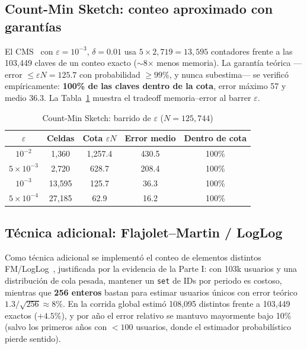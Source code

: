 \documentclass[conference]{IEEEtran}
\begin{document}
\subsection{Count-Min Sketch: conteo aproximado con garantías}
El CMS~\cite{cms} con $\varepsilon=10^{-3}$, $\delta=0.01$ usa $5 \times 2{,}719 = 13{,}595$ contadores frente a las 103{,}449 claves de un conteo exacto ($\sim$8$\times$ menos memoria). La garantía teórica ---error $\leq \varepsilon N = 125.7$ con probabilidad $\geq 99\%$, y nunca subestima--- se verificó empíricamente: \textbf{100\% de las claves dentro de la cota}, error máximo 57 y medio 36.3. La Tabla~\ref{tab:cms} muestra el tradeoff memoria--error al barrer $\varepsilon$.

\begin{table}[H]
  \caption{Count-Min Sketch: barrido de $\varepsilon$ ($N = 125{,}744$)}
  \centering
  \begin{tabular}{ccccc}
    \toprule
    $\varepsilon$ & Celdas & Cota $\varepsilon N$ & Error medio & Dentro de cota \\
    \midrule
    $10^{-2}$          & 1{,}360  & 1{,}257.4 & 430.5 & 100\% \\
    $5\times10^{-3}$   & 2{,}720  & 628.7     & 208.4 & 100\% \\
    $10^{-3}$          & 13{,}595 & 125.7     & 36.3  & 100\% \\
    $5\times10^{-4}$   & 27{,}185 & 62.9      & 16.2  & 100\% \\
    \bottomrule
  \end{tabular}
  \label{tab:cms}
\end{table}

\subsection{Técnica adicional: Flajolet--Martin / LogLog}
Como técnica adicional se implementó el conteo de elementos distintos FM/LogLog~\cite{fm,loglog}, justificada por la evidencia de la Parte I: con 103k usuarios y una distribución de cola pesada, mantener un \texttt{set} de IDs por periodo es costoso, mientras que \textbf{256 enteros} bastan para estimar usuarios únicos con error teórico $1.3/\sqrt{256}\approx 8\%$. En la corrida global estimó 108{,}095 distintos frente a 103{,}449 exactos ($+4.5\%$), y por año el error relativo se mantuvo mayormente bajo 10\% (salvo los primeros años con $<100$ usuarios, donde el estimador probabilístico pierde sentido).

\end{document}
